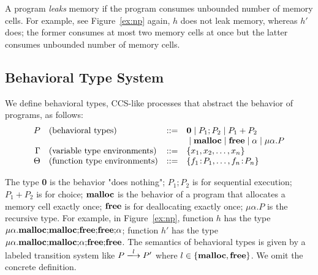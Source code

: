\documentclass{sigplanconf}
\begin{document}

A program \emph{leaks} memory if the program consumes unbounded number
of memory cells.  For example, see Figure~\ref{ex:np} again, \(h\)
does not leak memory, whereas \(h'\) does; the former
consumes at most two memory cells at once but the latter consumes
unbounded number of memory cells.

\subsection{Behavioral Type System}
 We define behavioral types, CCS-like processes that abstract the
 behavior of programs, as follows:
\[
\begin{array}{rlcl}
  P & (\mbox{behavioral types})&::=& {\bf 0} \;|\; P_{1};P_{2} \;|\; P_{1}+P_{2} \\
     & & & \;|\; \mathbf{malloc} \;|\; \mathbf{free} \;|\; \alpha \;|\; \mu\alpha.P \\
  \Gamma & (\mbox{variable type environments}) &::=& \{x_1, x_2, \dots, x_n\}\\
  \Theta & (\mbox{function type environments}) &::=& \{f_1\!:\! P_1,\dots,f_n\!:\! P_n\}\\
\end{array}
\]

The type {\bf 0} is the behavior "does nothing"; $P_{1};P_{2}$ is for
sequential execution; $P_{1}+P_{2}$ is for choice; $\mathbf{malloc}$ is the
behavior of a program that allocates a memory cell exactly once;
$\mathbf{free}$ is for deallocating exactly once; $\mu\alpha.P$ is the
recursive type. For example, in Figure~\ref{ex:np}, function \(h\) has
the type
\(\mu\alpha.\mathbf{malloc};\!\mathbf{malloc};\!\mathbf{free};\!\mathbf{free};\!\alpha\);
function \(h'\) has the type
\(\mu\alpha.\mathbf{malloc};\!\mathbf{malloc};\!\alpha;\!\mathbf{free};\!\mathbf{free}\).  The
semantics of behavioral types is given by a labeled transition system
like \(P\xlongrightarrow{l} P'\) where \(l \in \{\mathbf{malloc}, \mathbf{free}\}\). We
omit the concrete definition.
\end{document}
